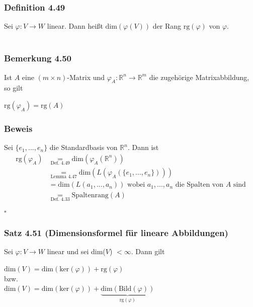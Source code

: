 \documentclass{article}
\begin{document}
\subsubsection*{Definition 4.49}
Sei $\varphi: V \rightarrow W$ linear. Dann heißt $\text{dim}(\varphi(V))$ der Rang $\text{rg}(\varphi)$ von $\varphi$. \\
\\
\subsubsection*{Bemerkung 4.50}
Ist $A$ eine $(m \times n)$-Matrix und $\varphi_A: \mathbb{R}^n \rightarrow \mathbb{R}^m$ die zugehörige Matrixabbildung, so gilt \\
\begin{center}
    $\text{rg}(\varphi_A) = \text{rg}(A)$ \\
\end{center}
\subsubsection*{Beweis}
Sei $\{e_1,...,e_n\}$ die Standardbasis von $\mathbb{R}^n$. Dann ist \\
\begin{align*}
    \text{rg}(\varphi_A) &\underset{\text{Def. 4.49}}{=} \text{dim}(\varphi_A(\mathbb{R}^n)) \\
    &\underset{\text{Lemma 4.47}}{=} \text{dim}(L(\varphi_A(\{e_1,...,e_n\}))) \\
    &= \text{dim}(L(a_1,...,a_n)) \text{ wobei } a_1,...,a_n \text{ die Spalten von } A \text{ sind} \\
    &\underset{\text{Def. 4.33}}{=} \text{Spaltenrang}(A) \\
\end{align*} 
$\square$ \\
\subsubsection*{Satz 4.51 (Dimensionsformel für lineare Abbildungen)}
Sei $\varphi: V \rightarrow W$ linear und sei dim($V$) $< \infty$. Dann gilt \\
\begin{center}
    $\text{dim}(V) = \text{dim}(\text{ker}(\varphi)) + \text{rg}(\varphi)$ \\
    bzw. \\
    $\text{dim}(V) = \text{dim}(\text{ker}(\varphi)) + \underbrace{\text{dim}(\text{Bild}(\varphi))}_{\text{rg}(\varphi)}$ \\
\end{center}
\end{document}
